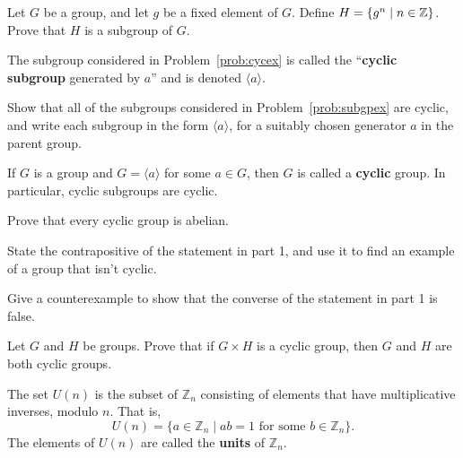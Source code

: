 \begin{problem}\label{prob:cycex}
Let \(G\) be a group, and let \(g\) be a fixed element of \(G\). Define \(H = \{g^n \mid n\in \mathbb{Z} \} \). Prove that \(H\) is a subgroup of \(G\).
\begin{annotation}
\end{annotation}
\end{problem}

\begin{definition}\label{def:cyclicgroup}
The subgroup considered in Problem~\ref{prob:cycex}  is called the ``\textbf{cyclic subgroup} generated by \(a\)'' and is denoted \(\langle a \rangle \).
\end{definition}

\begin{problem}
Show that all of the subgroups considered in Problem~\ref{prob:subgpex} are cyclic, and write each subgroup in the form \(\langle a\rangle\), for a suitably chosen generator \(a\) in the parent group.
\end{problem}

\begin{definition}
If \(G\) is a group and \(G = \langle a \rangle\) for some \(a \in G\), then \(G\) is called a \textbf{cyclic} group. In particular, cyclic subgroups are cyclic.
\end{definition}

\begin{problem}
    \mbox{}
\begin{problemparts}
  \item Prove that every cyclic group is abelian.
  \item State the contrapositive of the statement in part 1, and use it to find an example of a group that isn't cyclic.
  \item Give a counterexample to show that the converse of the statement in part 1 is false.
\end{problemparts}
\end{problem}

\begin{problem}
Let \(G\) and \(H\) be groups. Prove that if \(G\times H\) is a cyclic group, then \(G\) and \(H\) are both cyclic groups.
\end{problem}

\begin{definition}
The set \(U(n)\) is the subset of \(\mathbb{Z}_n\) consisting of elements that have multiplicative inverses, modulo \(n\). That is, \[U(n) = \{a \in \mathbb{Z}_n \mid ab = 1 \mbox{ for some } b \in \mathbb{Z}_n \}. \]
The elements of \(U(n)\) are called the \textbf{units} of \(\mathbb{Z}_n\).
\end{definition}

